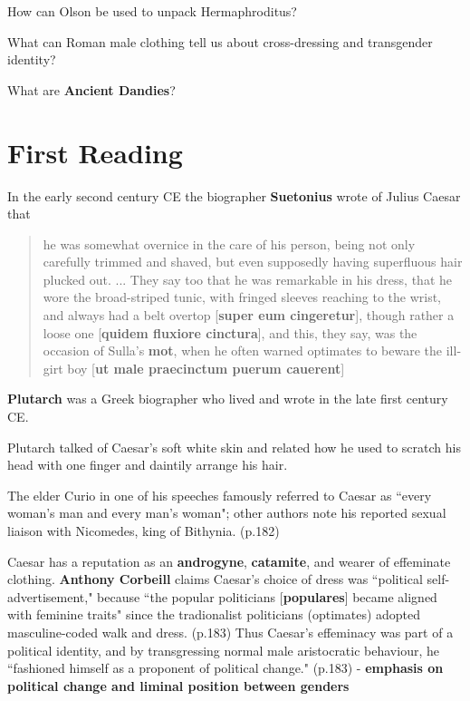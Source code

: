 \begin{qst}
    How can Olson be used to unpack Hermaphroditus?
\end{qst}


\begin{qst}
    What can Roman male clothing tell us about cross-dressing and transgender identity?
\end{qst}

\begin{qst}
    What are \textbf{Ancient Dandies}?
\end{qst}






\section{First Reading}
\label{sec:FirRead12}


In the early second century CE the biographer \textbf{Suetonius} wrote of Julius Caesar that 
\begin{quotation}
    he was somewhat overnice in the care of his person, being not only carefully trimmed and shaved, but even supposedly having superfluous hair plucked out. ... They say too that he was remarkable in his dress, that he wore the broad-striped tunic, with fringed sleeves reaching to the wrist, and always had a belt overtop [\textbf{super eum cingeretur}], though rather a loose one [\textbf{quidem fluxiore cinctura}], and this, they say, was the occasion of Sulla's \textbf{mot}, when he often warned optimates to beware the ill-girt boy [\textbf{ut male praecinctum puerum cauerent}]
\end{quotation}

\begin{nte}
    \textbf{Plutarch} was a Greek biographer who lived and wrote in the late first century CE.
\end{nte}

Plutarch talked of Caesar's soft white skin and related how he used to scratch his head with one finger and daintily arrange his hair. 

\begin{rmk}
    The elder Curio in one of his speeches famously referred to Caesar as ``every woman's man and every man's woman"; other authors note his reported sexual liaison with Nicomedes, king of Bithynia. (p.182)
\end{rmk}

Caesar has a reputation as an \textbf{androgyne}, \textbf{catamite}, and wearer of effeminate clothing. \textbf{Anthony Corbeill} claims Caesar's choice of dress was ``political self-advertisement," because ``the popular politicians [\textbf{populares}] became aligned with feminine traits" since the tradionalist politicians (optimates) adopted masculine-coded walk and dress. (p.183) Thus Caesar's effeminacy was part of a political identity, and by transgressing normal male aristocratic behaviour, he ``fashioned himself as a proponent of political change." (p.183) - \textbf{emphasis on political change and liminal position between genders}


